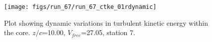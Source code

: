 \begin{figure}[H]
\centering
\texttt{[image: figs/run\_67/run\_67\_ctke\_01rdynamic]}
\caption{Plot showing dynamic variations in turbulent kinetic energy within the core. $z/c$=10.00, $V_{free}$=27.05, station 7.}
\end{figure}


